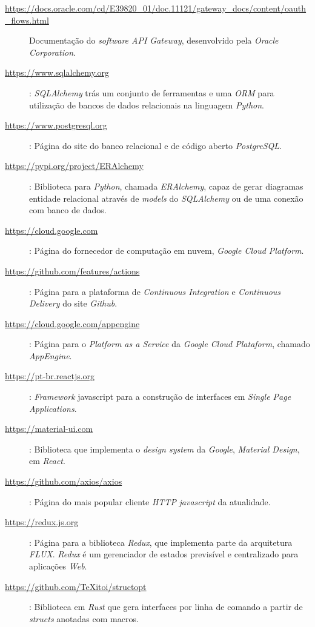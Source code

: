 \begin{description}
    \label{link:oauth}
    \item[\url{https://docs.oracle.com/cd/E39820_01/doc.11121/gateway_docs/content/oauth_flows.html}]
Documentação do \emph{software API Gateway}, desenvolvido pela \emph{Oracle Corporation}.

\label{link:sqlalchemy}
\item[\url{https://www.sqlalchemy.org}]: \emph{SQLAlchemy} trás um 
  conjunto de ferramentas e uma \emph{ORM} para utilização de bancos de dados relacionais 
  na linguagem \emph{Python}.

  \label{link:postgresql}
\item[\url{https://www.postgresql.org}]: Página do site do banco relacional e de código aberto 
  \emph{PostgreSQL}.

\label{link:eralchemy}
\item[\url{https://pypi.org/project/ERAlchemy}]: Biblioteca para \emph{Python}, chamada \emph{ERAlchemy}, 
  capaz de gerar diagramas entidade relacional através de \emph{models} do \emph{SQLAlchemy} ou de uma conexão 
  com banco de dados.

  \label{link:gcp}
\item[\url{https://cloud.google.com}]: Página do fornecedor de computação em nuvem, \emph{Google 
    Cloud Platform}.

  \label{link:actions}
\item[\url{https://github.com/features/actions}]: Página para a plataforma de \emph{Continuous Integration}
    e \emph{Continuous Delivery} do site \emph{Github}.

    \label{link:appengine}
\item[\url{https://cloud.google.com/appengine}]: Página para o \emph{Platform as a Service} da 
  \emph{Google Cloud Plataform}, chamado \emph{AppEngine}.

  \label{link:react}
\item[\url{https://pt-br.reactjs.org}]: \emph{Framework} javascript para a construção 
  de interfaces em \emph{Single Page Applications}.

  \label{link:mui}
\item[\url{https://material-ui.com}]: Biblioteca que implementa o \emph{design system} da 
  \emph{Google}, \emph{Material Design}, em \emph{React}.

  \label{link:axios}
\item[\url{https://github.com/axios/axios}]: Página do mais popular cliente \emph{HTTP} 
  \emph{javascript} da atualidade.

  \label{link:axios}
\item[\url{https://redux.js.org}]: Página para a biblioteca \emph{Redux}, que implementa 
  parte da arquitetura \emph{FLUX}. \emph{Redux} é um gerenciador de estados previsível 
  e centralizado para aplicações \emph{Web}.

  \label{link:struct_opt}
\item[\url{https://github.com/TeXitoi/structopt}]: Biblioteca em \emph{Rust} que gera 
  interfaces por linha de comando a partir de \emph{structs} anotadas com macros. 


\end{description}
